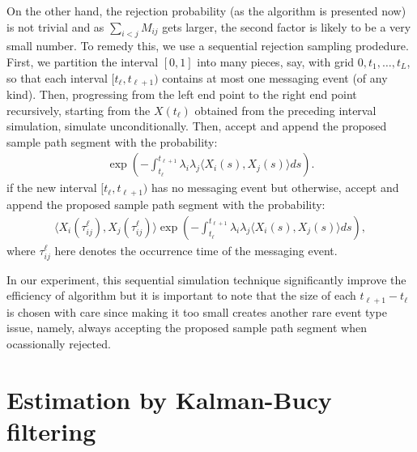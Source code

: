 \documentclass[12pt]{article}%
\begin{document}
On the other hand, the rejection probability (as the algorithm is presented now) is not trivial 
and as $\sum_{i<j} M_{ij}$ gets larger, the second factor is likely to be a very small number.  
To remedy this, we use a sequential rejection sampling prodedure.  
First, we partition the interval $[0,1]$ into many pieces, say, with grid $0,t_1,\ldots, t_L$, 
so that each interval $[t_{\ell},t_{\ell+1})$ contains at most one messaging event (of any kind). 
Then, progressing from the left end point to the right end point recursively, starting 
from the $X(t_{\ell})$ obtained from the preceding interval simulation, simulate unconditionally.  
Then, accept and append the proposed sample path segment with the probability:
\begin{eqnarray}
\exp\left(-\int_{t_{\ell}}^{t_{\ell+1}} \lambda_i \lambda_j \langle X_{i}(s), X_j(s)\rangle ds\right).
\end{eqnarray}
if the new interval $[t_{\ell},t_{\ell+1})$ has no messaging event but otherwise, accept and append the proposed sample path segment with the probability:
\begin{eqnarray}
\langle X_i(\tau_{ij}^\ell),X_j(\tau_{ij}^\ell)\rangle 
\exp\left(-\int_{t_{\ell}}^{t_{\ell+1}} \lambda_i \lambda_j \langle X_i(s), X_j(s)\rangle ds\right),
\end{eqnarray}
where $\tau_{ij}^\ell$ here denotes the occurrence time of the messaging event.

In our experiment, this sequential simulation technique significantly improve the efficiency of algorithm 
but it is important to note that the size of each $t_{\ell+1} - t_\ell$ is chosen with care since making 
it too small creates another rare event type issue, namely, always accepting the proposed sample path 
segment when ocassionally rejected.   


\section{Estimation by Kalman-Bucy filtering}
\end{document}
